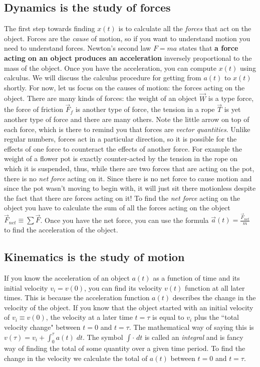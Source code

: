 \documentclass[letterpaper,9pt,journal]{IEEEtran}
\begin{document}
\subsection{Dynamics is the study of forces}
The first step towards finding $x(t)$ is to calculate all the \emph{forces} that act on the object.
Forces are the \emph{cause} of motion, so if you want to understand motion you need to understand forces. 
Newton's second law $F=ma$ states that {\bf a force acting on an object produces an acceleration}
inversely proportional to the mass of the object. 
Once you have the acceleration, you can compute $x(t)$ using calculus.
We will discuss the calculus procedure for getting from $a(t)$ to $x(t)$ shortly.
For now, let us focus on the causes of motion: the forces acting on the object.
There are many kinds of forces: the weight of an object $\vec{W}$ is a type force, 
the force of friction $\vec{F}_f$ is another type of force, the tension in a rope $\vec{T}$ is 
yet another type of force and there are many others.
Note the little arrow on top of each force, which is there to remind you that forces are \emph{vector quantities}.
Unlike regular numbers, forces act in a particular direction, so it is possible for the effects of 
one force to counteract the effects of another force. For example the weight of a flower pot 
is exactly counter-acted by the tension in the rope on which it is suspended, thus,
while there are two forces that are acting on the pot, there is no \emph{net force} acting on it.
Since there is no net force to cause motion and since the pot wasn't moving to begin with, 
it will just sit there motionless despite the fact that there are forces acting on it!
To find the \emph{net force} acting on the object you have to calculate 
the sum of all the forces acting on the object $\vec{F}_{net} \equiv \sum \vec{F}$.
Once you have the net force, you can use the formula $\vec{a}(t) = \frac{\vec{F}_{net}}{m}$ 
to find the acceleration of the object.

\vspace{-2mm}
\subsection{Kinematics is the study of motion}
If you know the acceleration of an object $a(t)$ as a function of time and its initial velocity $v_i=v(0)$, 
you can find its velocity $v(t)$ function at all later times. 
This is because the acceleration function $a(t)$ describes the change in the velocity of the object.
If you know that the object started with an initial velocity of $v_i \equiv v(0)$,
the velocity at a later time $t=\tau$ is equal to $v_i$ plus the ``total velocity change" between $t=0$ and $t=\tau$.
The mathematical way of saying this is $v(\tau)=v_i+\int_0^\tau a(t)\;dt$.
The symbol $\int \cdot \;dt$ is called an \emph{integral} and is fancy way of finding the total
of some quantity over a given time period. 
To find the change in the velocity we calculate the total of $a(t)$ between $t=0$ and $t=\tau$.
\end{document}
